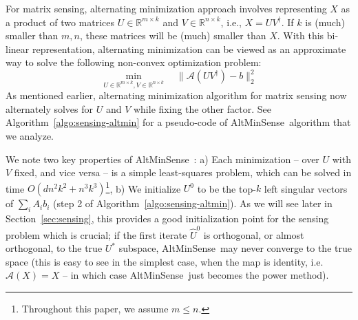 \documentclass[11pt]{article}
\theoremstyle{plain}
\theoremstyle{definition}
\newcommand{\aff}{{\mathcal A}}
\newcommand{\as}{AltMinSense\ }
\begin{document}
For matrix sensing, alternating minimization approach involves representing $X$ as a product of two matrices $U\in \mathbb{R}^{m\times k}$ and $V\in \mathbb{R}^{n\times k}$, i.e., $X=UV^\dag$. If $k$ is (much) smaller than $m,n$, these matrices will be (much) smaller than $X$. With this bi-linear representation, alternating minimization can be viewed as an approximate way to solve the following non-convex optimization problem: 
\[
\min_{U\in \mathbb{R}^{m\times k}, V\in \mathbb{R}^{n\times k}}  \quad  \|\aff(UV^\dag) - b\|^2_2 
\]
As mentioned earlier, alternating minimization algorithm for matrix sensing  now alternately solves for $U$ and $V$ while fixing the other factor. See Algorithm~\ref{algo:sensing-altmin} for a pseudo-code of  \as algorithm that we analyze. 

We note  two key properties of \as: a) Each minimization -- over $U$ with $V$ fixed, and vice versa -- is a simple least-squares problem, which can be solved in time $O(dn^2k^2+n^3k^3)$\footnote{Throughout this paper, we assume $m\leq n$.}, b) We initialize $U^0$ to be the top-$k$ left singular vectors of  $\sum_i A_i b_i$ (step 2 of Algorithm~\ref{algo:sensing-altmin}). As we will see later in Section~\ref{sec:sensing}, this provides a good initialization point for the sensing problem which is crucial; if the first iterate $\widehat{U}^0$ is orthogonal, or almost orthogonal, to the true $U^*$ subspace, \as  may never converge to the true space (this is easy to see in the simplest case, when the map is identity, i.e. $\aff(X) = X$ -- in which case \as just becomes the power method). %

\end{document}

